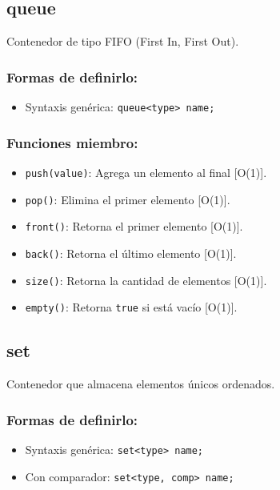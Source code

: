 \subsection{queue}
\label{subsec:std_queue}
Contenedor de tipo FIFO (First In, First Out). 

\subsubsection{Formas de definirlo:}
\begin{itemize}
  \item Syntaxis genérica: \texttt{queue<type> name;}
\end{itemize}

\subsubsection{Funciones miembro:}
\begin{itemize}
  \item \texttt{push(value)}: Agrega un elemento al final [O(1)].
  \item \texttt{pop()}: Elimina el primer elemento [O(1)].
  \item \texttt{front()}: Retorna el primer elemento [O(1)].
  \item \texttt{back()}: Retorna el último elemento [O(1)].
  \item \texttt{size()}: Retorna la cantidad de elementos [O(1)].
  \item \texttt{empty()}: Retorna \texttt{true} si está vacío [O(1)]. 
\end{itemize}

\subsection{set}
\label{subsec:std_set}
Contenedor que almacena elementos únicos ordenados. 

\subsubsection{Formas de definirlo:}
\begin{itemize}
  \item Syntaxis genérica: \texttt{set<type> name;}
  \item Con comparador: \texttt{set<type, comp> name;}
\end{itemize}

